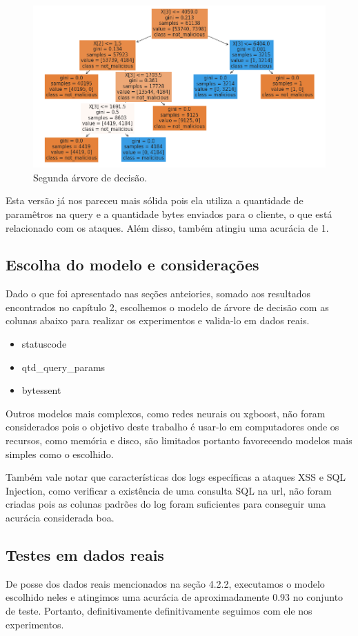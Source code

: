 \begin{figure}
    \centering
    \includegraphics[width=.9\textwidth]{figuras/segunda_arvore.png}
    \caption{Segunda árvore de decisão. \label{fig:segunda_arvore}}    
\end{figure}

Esta versão já nos pareceu mais sólida pois ela utiliza a quantidade de paramêtros na query 
e a quantidade bytes enviados para o cliente, o que está relacionado com os ataques. Além disso,
também atingiu uma acurácia de 1.

\subsection{Escolha do modelo e considerações}

Dado o que foi apresentado nas seções anteiories, somado aos resultados encontrados no capítulo 2, escolhemos o modelo de árvore de decisão com as colunas
abaixo para realizar os experimentos e valida-lo em dados reais. 

\begin{itemize}
    \item statuscode
    \item qtd\_query\_params
    \item bytessent
\end{itemize}

Outros modelos mais complexos, como redes neurais ou xgboost, não foram considerados pois o 
objetivo deste trabalho é usar-lo em computadores onde os recursos, como memória e disco, são
limitados portanto favorecendo modelos mais simples como o escolhido.

Também vale notar que características dos logs específicas a ataques XSS e SQL Injection, como 
verificar a existência de uma consulta SQL na url, não foram criadas pois as colunas padrões 
do log foram suficientes para conseguir uma acurácia considerada boa.

\subsection{Testes em dados reais}

De posse dos dados reais mencionados na seção 4.2.2, executamos o modelo escolhido neles e atingimos 
uma acurácia de aproximadamente 0.93 no conjunto de teste. Portanto, definitivamente definitivamente
seguimos com ele nos experimentos.
